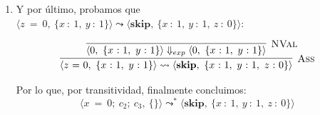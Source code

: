 \documentclass[12pt, a4paper]{article}
\begin{document}
\begin{enumerate}[leftmargin=*]
Nuevamente por transitividad,
\[
\langle x\ {=}\ 0;\ c_2;\ c_3,\ \{\}\rangle \leadsto^{*} \langle z\ {=}\ 0,\ \{x\ {:}\ 1,\ y\ {:}\ 1\}\rangle
\]


\item Y por último, probamos que $\langle z\ {=}\ 0,\ \{x\ {:}\ 1,\ y\ {:}\ 1\}\rangle \leadsto \langle \mathbf{skip},\ \{x\ {:}\ 1,\ y\ {:}\ 1,\ z\ {:}\ 0\}\rangle$:

\[
\infer[\textsc{Ass}]
  {\langle z\ {=}\ 0,\ \{x\ {:}\ 1,\ y\ {:}\ 1\}\rangle \leadsto \langle \mathbf{skip},\ \{x\ {:}\ 1,\ y\ {:}\ 1,\ z\ {:}\ 0\}\rangle}
  {\infer[\textsc{NVal}]
    {\langle 0,\ \{x\ {:}\ 1,\ y\ {:}\ 1\}\rangle \Downarrow_{exp} \langle 0,\ \{x\ {:}\ 1,\ y\ {:}\ 1\}\rangle}
    {}}
\]

Por lo que, por transitividad, finalmente concluimos:
\[
\langle x\ {=}\ 0;\ c_2;\ c_3,\ \{\}\rangle \leadsto^{*} \langle \mathbf{skip},\ \{x\ {:}\ 1,\ y\ {:}\ 1,\ z\ {:}\ 0\}\rangle
\]
\end{enumerate}
\end{document}
